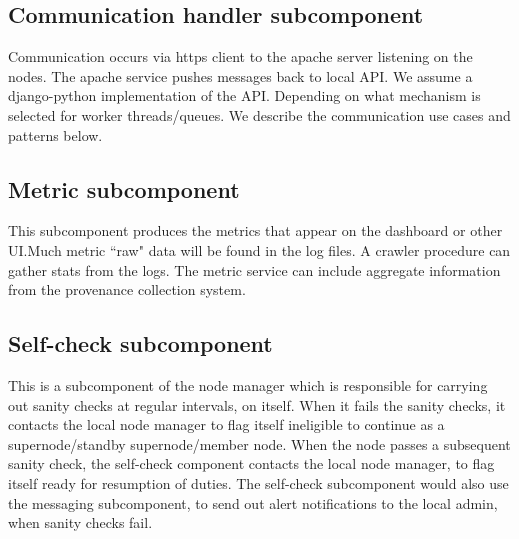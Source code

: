 \documentclass[oneside,12pt]{memoir}
\begin{document}
\begin{enumerate}

\end{enumerate}

\subsection{Communication handler subcomponent}
Communication occurs via https client to the apache server listening on the nodes.   The apache service pushes messages back to local API.   We assume a django-python implementation of the API.  Depending on what mechanism is selected for worker threads/queues.
 We describe the communication use cases and patterns below.  


\subsection{Metric subcomponent}

This subcomponent produces the metrics that appear on the dashboard or other UI.Much metric ``raw" data will be found in the log files.  A crawler procedure can gather stats from the logs.   The metric service can include aggregate information from the provenance collection system. 

\subsection{Self-check subcomponent}
This is a subcomponent of the node manager which is responsible for carrying out sanity checks at regular intervals, on itself. When it fails the sanity checks, it contacts the local node manager to flag itself ineligible to continue as a supernode/standby supernode/member node. When the node passes a subsequent sanity check, the self-check component contacts the local node manager, to flag itself ready for resumption of duties.  The self-check subcomponent would also use the messaging subcomponent, to send out alert notifications to the local admin, when sanity checks fail.
\end{document}
